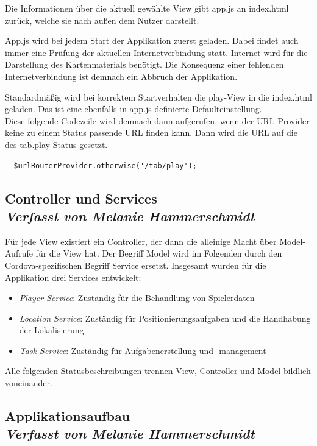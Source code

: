 Die Informationen über die aktuell gewählte View gibt app.js an index.html zurück, welche sie nach außen dem Nutzer darstellt.


App.js wird bei jedem Start der Applikation zuerst geladen. Dabei findet auch immer eine Prüfung der aktuellen Internetverbindung statt. Internet wird für die Darstellung des Kartenmaterials benötigt. Die Konsequenz einer fehlenden Internetverbindung ist demnach ein Abbruch der Applikation.


Standardmäßig wird bei korrektem Startverhalten die play-View in die index.html geladen. Das ist eine ebenfalls in app.js definierte Defaulteinstellung.
\\
Diese folgende Codezeile wird demnach dann aufgerufen, wenn der URL-Provider keine zu einem Status passende URL finden kann. Dann wird die URL auf die des tab.play-Status gesetzt.
\begin{lstlisting}
  $urlRouterProvider.otherwise('/tab/play');
\end{lstlisting}

\subsection[Controller und Services]{Controller und Services
 \\ \textnormal{\small{\textit {Verfasst von Melanie Hammerschmidt}}}}

Für jede View existiert ein Controller, der dann die alleinige Macht über Model-Aufrufe für die View hat. Der Begriff Model wird im Folgenden durch den Cordova-spezifischen Begriff Service ersetzt. Insgesamt wurden für die Applikation drei Services entwickelt:
\begin{itemize}
\item \emph{Player Service}: Zuständig für die Behandlung von Spielerdaten
\item \emph{Location Service}: Zuständig für Positionierungsaufgaben und die Handhabung der Lokalisierung
\item \emph{Task Service}: Zuständig für Aufgabenerstellung und -management
\end{itemize}
Alle folgenden Statusbeschreibungen trennen View, Controller und Model bildlich voneinander.
\\
\subsection[Applikationsaufbau]{Applikationsaufbau
 \\ \textnormal{\small{\textit {Verfasst von Melanie Hammerschmidt}}}}
 
